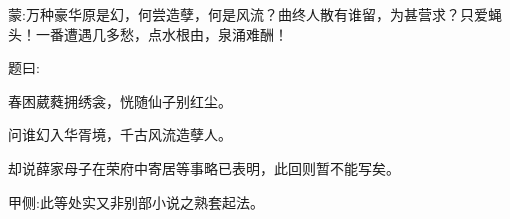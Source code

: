 


\begin{parag}
    \begin{note}蒙:万种豪华原是幻，何尝造孽，何是风流？曲终人散有谁留，为甚营求？只爱蝇头！一番遭遇几多愁，点水根由，泉涌难酬！
    \end{note}
\end{parag}


\begin{parag}
    题曰:
\end{parag}


\begin{poem}
    \begin{pl}春困葳蕤拥绣衾，恍随仙子别红尘。\end{pl}

    \begin{pl}问谁幻入华胥境，千古风流造孽人。\end{pl}
\end{poem}


\begin{parag}
    却说薛家母子在荣府中寄居等事略已表明，此回则暂不能写矣。\begin{note}甲侧:此等处实又非别部小说之熟套起法。\end{note}
\end{parag}


